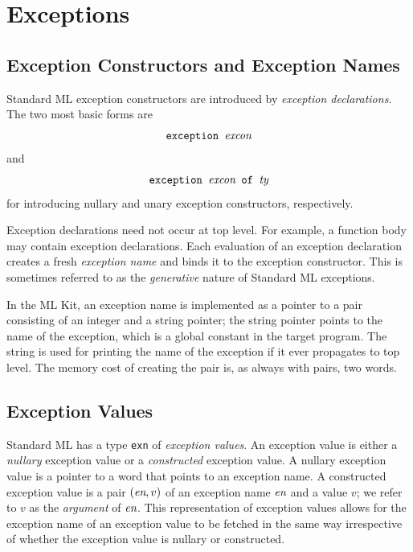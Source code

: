 \documentclass[12pt]{book}
\begin{document}
\chapter{Exceptions}
\label{exceptions.sec}
\section{Exception Constructors and Exception Names}
Standard ML
%
%
exception constructors are introduced by
%
% 
{\em exception declarations}. The two most basic forms are
$$\hbox{\tt exception {\it excon}}$$
and 
$$\hbox{\tt exception {\it excon} of {\it ty}}$$
for introducing nullary and unary exception constructors,
respectively. 

Exception declarations need not
occur at top level. For example, a function body may contain exception
declarations.  Each evaluation of an exception declaration creates a
fresh
%
%
{\em exception name\/} and binds it to the exception constructor. This
is sometimes referred to as the {\em generative\/} nature of Standard ML
exceptions.

In the ML Kit, an exception name is implemented as a pointer to a pair
consisting of an integer and a string pointer; the string pointer
points to the name of the exception, which is a global constant in the
target program. The string is used for printing the name of the
exception if it ever propagates to top level. The memory cost of creating
the pair is, as always with pairs, two words.

\section{Exception Values}
Standard ML has a type 
%
{\tt exn} of 
%
{\em exception values}.  An exception value is either a
%
{\em nullary\/} exception value or a 
%
{\em constructed\/} exception value. A nullary exception value is a
pointer to a word that points to an exception name. A constructed
exception value is a pair $(\hbox{\it en},v)$ of an exception name $\hbox{\it en}$
and a value $v$; we refer to $v$ as the {\em argument\/} of $\hbox{\it en}$.
This representation of exception values allows for the exception name
of an exception value to be fetched in the same way irrespective of whether the
exception value is nullary or constructed.
\end{document}
